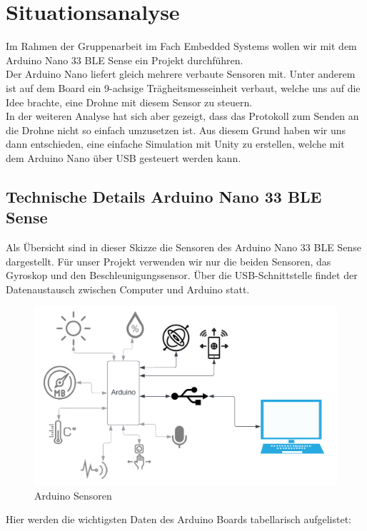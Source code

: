 \section{Situationsanalyse}

Im Rahmen der Gruppenarbeit im Fach Embedded Systems wollen wir mit dem Arduino Nano 33 BLE Sense ein Projekt durchführen.\\
Der Arduino Nano liefert gleich mehrere verbaute Sensoren mit. Unter anderem ist auf dem Board ein 9-achsige Trägheitsmesseinheit verbaut, welche uns auf die Idee brachte, eine Drohne mit diesem Sensor zu steuern.\\
In der weiteren Analyse hat sich aber gezeigt, dass das Protokoll zum Senden an die Drohne nicht so einfach umzusetzen ist. Aus diesem Grund haben wir uns dann entschieden, eine einfache Simulation mit Unity zu erstellen, welche mit dem Arduino Nano über USB gesteuert werden kann.

\subsection{Technische Details Arduino Nano 33 BLE Sense}
Als Übersicht sind in dieser Skizze die Sensoren des Arduino Nano 33 BLE Sense dargestellt. Für unser Projekt verwenden wir nur die beiden Sensoren, das Gyroskop und den Beschleunigungssensor. Über die USB-Schnittstelle findet der Datenaustausch zwischen Computer und Arduino statt.

\vspace{2cm}
\begin{figure}[H]
  \begin{center}
    \includegraphics[width=0.6\linewidth]{content/images/system.png}
    \caption{Arduino Sensoren}
  \end{center}
\end{figure}

\newpage
Hier werden die wichtigsten Daten des Arduino Boards tabellarisch aufgelistet:

